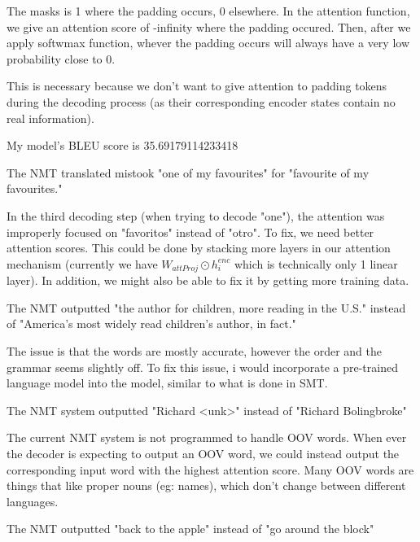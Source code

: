 \documentclass[11pt,largemargins]{homework}
\begin{document}
\maketitle
 
\question
The masks is 1 where the padding occurs, 0 elsewhere. In the attention function, we give an attention score of -infinity where the padding occured.  Then, after we apply softwmax function, whever the padding occurs will always have a very low probability close to 0. 

This is necessary because we don't want to give attention to padding tokens during the decoding process (as their corresponding encoder states contain no real information). 

\question

My model's BLEU score is 35.69179114233418

\question

The NMT translated mistook "one of my favourites" for "favourite of my favourites." 

In the third decoding step (when trying to decode "one"), the attention was improperly focused on "favoritos" instead of "otro". To fix, we need better attention scores. This could be done by stacking more layers in our attention mechanism (currently we have $W_{attProj} \odot h_i^{enc}$ which is technically only 1 linear layer). In addition, we might also be able to fix it by getting more training data. 

\question
The NMT outputted "the author for children, more reading in the U.S." instead of "America’s most widely read children’s author, in fact."

The issue is that the words are mostly accurate, however the order and the grammar seems slightly off. To fix this issue, i would incorporate a pre-trained language model into the model, similar to what is done in SMT. 

\question 
The NMT system outputted "Richard <unk>" instead of "Richard Bolingbroke"

The current NMT system is not programmed to handle OOV words. When ever the decoder is expecting to output an OOV word, we could instead output the corresponding input word with the highest attention score. Many OOV words are things that like proper nouns (eg: names), which don't change between different languages. 

\question

The NMT outputted "back to the apple" instead of "go around the block"
\end{document}
